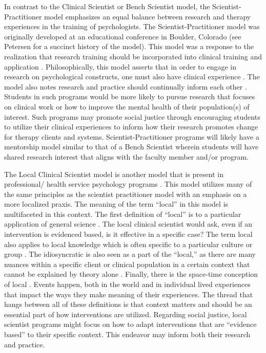 \documentclass[
  11pt,
]{book}
\begin{document}
In contrast to the Clinical Scientist or Bench Scientist model, the Scientist-Practitioner model emphasizes an equal balance between research and therapy experiences in the training of psychologists. The Scientist-Practitioner model was originally developed at an educational conference in Boulder, Colorado (see Petersen \citeyearpar{petersen_historical_2007} for a succinct history of the model). This model was a response to the realization that research training should be incorporated into clinical training and application \citep{jones_foundations_2007}. Philosophically, this model asserts that in order to engage in research on psychological constructs, one must also have clinical experience \citep{deangelis_three_2003}. The model also notes research and practice should continually inform each other \citep{jones_foundations_2007}. Students in such programs would be more likely to pursue research that focuses on clinical work or how to improve the mental health of their population(s) of interest. Such programs may promote social justice through encouraging students to utilize their clinical experiences to inform how their research promotes change for therapy clients and systems. Scientist-Practitioner programs will likely have a mentorship model similar to that of a Bench Scientist wherein students will have shared research interest that aligns with the faculty member and/or program.

The Local Clinical Scientist model is another model that is present in professional/ health service psychology programs \citep{trierweiler_research_2010}. This model utilizes many of the same principles as the scientist practitioner model with an emphasis on a more localized praxis. The meaning of the term ``local'' in this model is multifaceted in this context. The first definition of ``local'' is to a particular application of general science \citep{stricker_local_2006}. The local clinical scientist would ask, even if an intervention is evidenced based, is it effective in a specific case? The term local also applies to local knowledge which is often specific to a particular culture or group \citep{stricker_local_2006}. The idiosyncratic is also seen as a part of the ``local,'' as there are many nuances within a specific client or clinical population in a certain context that cannot be explained by theory alone \citep{stricker_local_2006}. Finally, there is the space-time conception of local \citep{stricker_local_2006}. Events happen, both in the world and in individual lived experiences that impact the ways they make meaning of their experiences. The thread that hangs between all of these definitions is that context matters and should be an essential part of how interventions are utilized. Regarding social justice, local scientist programs might focus on how to adapt interventions that are ``evidence based'' to their specific context. This endeavor may inform both their research and practice.
\end{document}

